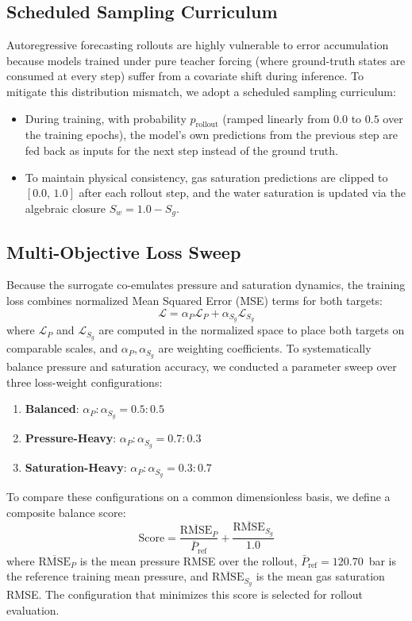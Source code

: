 \documentclass[10pt,twocolumn]{article}
\begin{document}
\subsection{Scheduled Sampling Curriculum}
Autoregressive forecasting rollouts are highly vulnerable to error accumulation because models trained under pure teacher forcing (where ground-truth states are consumed at every step) suffer from a covariate shift during inference. To mitigate this distribution mismatch, we adopt a scheduled sampling curriculum:
\begin{itemize}
    \item During training, with probability $p_{\text{rollout}}$ (ramped linearly from $0.0$ to $0.5$ over the training epochs), the model's own predictions from the previous step are fed back as inputs for the next step instead of the ground truth.
    \item To maintain physical consistency, gas saturation predictions are clipped to $[0.0,\, 1.0]$ after each rollout step, and the water saturation is updated via the algebraic closure $S_w = 1.0 - S_g$.
\end{itemize}

\subsection{Multi-Objective Loss Sweep}
Because the surrogate co-emulates pressure and saturation dynamics, the training loss combines normalized Mean Squared Error (MSE) terms for both targets:
\begin{equation}
\label{eq:loss}
\mathcal{L} = \alpha_P \mathcal{L}_P + \alpha_{S_g} \mathcal{L}_{S_g}
\end{equation}
where $\mathcal{L}_P$ and $\mathcal{L}_{S_g}$ are computed in the normalized space to place both targets on comparable scales, and $\alpha_P, \alpha_{S_g}$ are weighting coefficients. To systematically balance pressure and saturation accuracy, we conducted a parameter sweep over three loss-weight configurations:
\begin{enumerate}
    \item \textbf{Balanced}: $\alpha_P : \alpha_{S_g} = 0.5 : 0.5$
    \item \textbf{Pressure-Heavy}: $\alpha_P : \alpha_{S_g} = 0.7 : 0.3$
    \item \textbf{Saturation-Heavy}: $\alpha_P : \alpha_{S_g} = 0.3 : 0.7$
\end{enumerate}

To compare these configurations on a common dimensionless basis, we define a composite balance score:
\begin{equation}
\label{eq:composite_score}
\text{Score} = \frac{\overline{\text{RMSE}}_P}{\bar{P}_{\text{ref}}} + \frac{\overline{\text{RMSE}}_{S_g}}{1.0}
\end{equation}
where $\overline{\text{RMSE}}_P$ is the mean pressure RMSE over the rollout, $\bar{P}_{\text{ref}} = 120.70$~bar is the reference training mean pressure, and $\overline{\text{RMSE}}_{S_g}$ is the mean gas saturation RMSE. The configuration that minimizes this score is selected for rollout evaluation.
\end{document}
